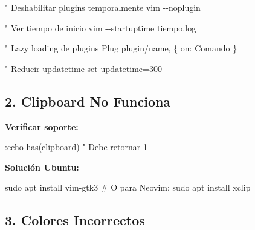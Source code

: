 \documentclass[
  doc,
  floatsintext,
  longtable,
  a4paper,
  nolmodern,
  notxfonts,
  notimes,
  12pt,
  colorlinks=true,linkcolor=blue,citecolor=blue,urlcolor=blue]{apa7}
\newenvironment{Shaded}{\begin{snugshade}}{\end{snugshade}}
\newcommand{\CommentTok}[1]{\textcolor[rgb]{0.37,0.37,0.37}{#1}}
\newcommand{\FunctionTok}[1]{\textcolor[rgb]{0.28,0.35,0.67}{#1}}
\newcommand{\NormalTok}[1]{\textcolor[rgb]{0.00,0.23,0.31}{#1}}
\begin{document}
\begin{Shaded}
\begin{Highlighting}[]
\NormalTok{" Deshabilitar plugins temporalmente}
\NormalTok{vim {-}{-}noplugin}

\NormalTok{" Ver tiempo de inicio}
\NormalTok{vim {-}{-}startuptime tiempo.log}

\NormalTok{" Lazy loading de plugins}
\NormalTok{Plug \textquotesingle{}plugin/name\textquotesingle{}, \{ \textquotesingle{}on\textquotesingle{}: \textquotesingle{}Comando\textquotesingle{} \}}

\NormalTok{" Reducir updatetime}
\NormalTok{set updatetime=300}
\end{Highlighting}
\end{Shaded}

\subsection{2. Clipboard No Funciona}\label{clipboard-no-funciona}

\textbf{Verificar soporte:}

\begin{Shaded}
\begin{Highlighting}[]
\NormalTok{:echo has(\textquotesingle{}clipboard\textquotesingle{})  " Debe retornar 1}
\end{Highlighting}
\end{Shaded}

\textbf{Solución Ubuntu:}

\begin{Shaded}
\begin{Highlighting}[]
\FunctionTok{sudo}\NormalTok{ apt install vim{-}gtk3}
\CommentTok{\# O para Neovim:}
\FunctionTok{sudo}\NormalTok{ apt install xclip}
\end{Highlighting}
\end{Shaded}

\subsection{3. Colores Incorrectos}\label{colores-incorrectos}

\begin{Shaded}
\end{Shaded}
\end{document}
